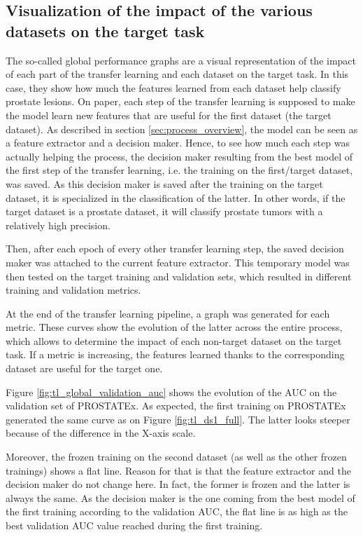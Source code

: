 \subsection{Visualization of the impact of the various datasets on the target task}
\setlength{\marginparwidth}{3cm}\leavevmode {}The so-called global performance graphs are a visual representation of the impact of each part of the transfer learning and each dataset on the target task. In this case, they show how much the features learned from each dataset help classify prostate lesions. On paper, each step of the transfer learning is supposed to make the model learn new features that are useful for the first dataset (the target dataset). As described in section \ref{sec:process_overview}, the model can be seen as a feature extractor and a decision maker. Hence, to see how much each step was actually helping the process, the decision maker resulting from the best model of the first step of the transfer learning, i.e. the training on the first/target dataset, was saved. As this decision maker is saved after the training on the target dataset, it is specialized in the classification of the latter. In other words, if the target dataset is a prostate dataset, it will classify prostate tumors with a relatively high precision.

Then, after each epoch of every other transfer learning step, the saved decision maker was attached to the current feature extractor. This temporary model was then tested on the target training and validation sets, which resulted in different training and validation metrics.

At the end of the transfer learning pipeline, a graph was generated for each metric. These curves show the evolution of the latter across the entire process, which allows to determine the impact of each non-target dataset on the target task. If a metric is increasing, the features learned thanks to the corresponding dataset are useful for the target one.

Figure \ref{fig:tl_global_validation_auc} shows the evolution of the AUC on the validation set of PROSTATEx. As expected, the first training on PROSTATEx generated the same curve as on Figure \ref{fig:tl_ds1_full}. The latter looks steeper because of the difference in the X-axis scale.

Moreover, the frozen training on the second dataset (as well as the other frozen trainings) shows a flat line. Reason for that is that the feature extractor and the decision maker do not change here. In fact, the former is frozen and the latter is always the same. As the decision maker is the one coming from the best model of the first training according to the validation AUC, the flat line is as high as the best validation AUC value reached during the first training.

